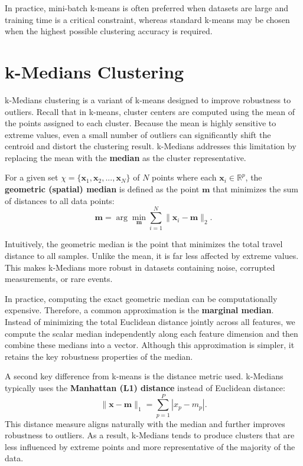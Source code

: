 \documentclass{article}
\begin{document}
In practice, mini-batch k-means is often preferred when datasets are large and
training time is a critical constraint, whereas standard k-means may be chosen
when the highest possible clustering accuracy is required.

\section{k-Medians Clustering}

k-Medians clustering is a variant of k-means designed to improve robustness to
outliers. Recall that in k-means, cluster centers are computed using the mean of
the points assigned to each cluster. Because the mean is highly sensitive to
extreme values, even a small number of outliers can significantly shift the
centroid and distort the clustering result. k-Medians addresses this limitation
by replacing the mean with the \textbf{median} as the cluster representative.

For a given set $\chi = \{\mathbf{x}_1, \mathbf{x}_2, ...,\mathbf{x}_N\}$ of
$N$ points where each $\mathbf{x}_i \in \mathbb{R}^p$, the \textbf{geometric
(spatial) median} is defined as the point $\mathbf{m}$ that minimizes the sum of
distances to all data points:
\[
\mathbf{m} = \arg \min_{\mathbf{m}} \sum_{i=1}^{N} \|\mathbf{x}_i - \mathbf{m}\|_2.
\]

Intuitively, the geometric median is the point that minimizes the total travel
distance to all samples. Unlike the mean, it is far less affected by extreme
values. This makes k-Medians more robust in datasets containing noise, corrupted
measurements, or rare events.

In practice, computing the exact geometric median can be computationally
expensive. Therefore, a common approximation is the \textbf{marginal median}.
Instead of minimizing the total Euclidean distance jointly across all features,
we compute the scalar median independently along each feature dimension and then
combine these medians into a vector. Although this approximation is simpler, it
retains the key robustness properties of the median.

A second key difference from k-means is the distance metric used. k-Medians
typically uses the \textbf{Manhattan (L1) distance} instead of Euclidean
distance:
\[
\|\mathbf{x} - \mathbf{m}\|_1 = \sum_{p=1}^{P} |x_p - m_p|.
\]
This distance measure aligns naturally with the median and further improves
robustness to outliers. As a result, k-Medians tends to produce clusters that are
less influenced by extreme points and more representative of the majority of the
data.
\end{document}
